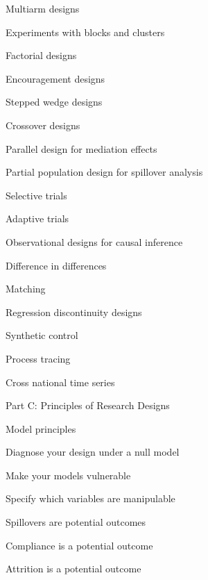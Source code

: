 \documentclass[11pt]{article}
\begin{document}
\begin{legal}
\begin{legal}
		\begin{legal}
		\item 	Multiarm designs
		\item 	Experiments with blocks and clusters
		\item 	Factorial designs
		\item 	Encouragement designs 
		\item 	Stepped wedge designs		
   	    \item 	Crossover designs
   	    \item   Parallel design for mediation effects
		\item 	Partial population design for spillover analysis
		\item 	Selective trials
		\item         Adaptive trials 
		\end{legal}
\newpage
\vspace{-5mm}
	\item Observational designs for causal inference
	
		\begin{legal}
		\item   Difference in differences
		\item 	Matching
		\item 	Regression discontinuity designs
		\item 	Synthetic control
		\item 	Process tracing
		\item 	Cross national time series
		\end{legal}
	\end{legal}

\item Part C: Principles of Research Designs
	
	\vspace{-2mm} %
	
	\begin{legal}
	\item Model principles
	
		\begin{legal}
		\item 	Diagnose your design under a null model 
		\item 	Make your models vulnerable 
		\item 	Specify which variables are manipulable
		\item 	Spillovers are potential outcomes
		\item 	Compliance is a potential outcome
		\item 	Attrition is a potential outcome
		\end{legal}
		

\end{legal}
\end{legal}
\end{document}

